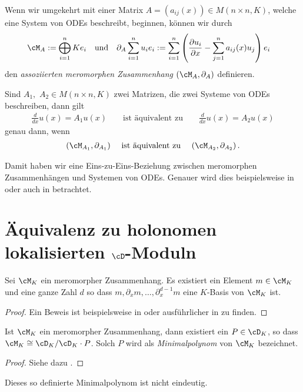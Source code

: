 \begin{defn}
Wenn wir umgekehrt mit einer Matrix $A=(a_{ij}(x))\in M(n\times n,K)$,
welche eine System von ODEs beschreibt, beginnen, können wir durch
\begin{align*}
\cM_A & :=\bigoplus_{i=1}^n Ke_i &&\text{und}
& \partial_A \sum_{i=1}^n u_ie_i &:= \sum_{i=1}^n\left(
\frac{\partial u_i}{\partial x}-\sum_{j=1}^na_{ij}(x)u_j \right)e_i
\end{align*}
den \emph{assoziierten meromorphen Zusammenhang} $(\cM_A,\partial_A)$ definieren.
\end{defn}
\begin{comment}
TODO: zueinander inverse bijektionen?
\end{comment}
\begin{lem}
Sind $A_1,$ $A_2\in M(n\times n,K)$ zwei Matrizen, die zwei Systeme von ODEs
beschreiben, dann gilt
\begin{align*}
\frac{d}{dx}u(x)=A_1u(x) && \text{ ist äquivalent zu }
&& \frac{d}{dx}u(x)=A_2u(x)
\end{align*}
genau dann, wenn
\begin{align*}
(\cM_{A_1},\partial_{A_1}) && \text{ ist äquivalent zu }
&& (\cM_{A_2},\partial_{A_2}) \,.
\end{align*}
\end{lem}
Damit haben wir eine Eins-zu-Eins-Beziehung zwischen meromorphen
Zusammenhängen und Systemen von ODEs.
Genauer wird dies beispielsweise in \cite[Sec 5.1]{hotta2007d} oder
auch in \cite[Sec 3]{sabbah_cimpa90} betrachtet.

\section{Äquivalenz zu holonomen lokalisierten $\cD$-Moduln}
\begin{lem} \label{lem:Zyklischer-Vektor}
Sei $\cM_K$ ein meromorpher Zusammenhang. Es existiert ein Element
$m\in\cM_K$ und eine ganze Zahl $d$ so dass
$m,\partial_xm,\dots,\partial_x^{d-1}m$ eine $K$-Basis von $\cM_K$ ist.
\end{lem}

\begin{proof}
Ein Beweis ist beispielsweise in \cite[Thm 4.3.3]{sabbah_cimpa90} oder
ausführlicher in \cite[Satz 4.8]{ZulaBarbara} zu finden.
\end{proof}
\begin{lemdef}
Ist $\cM_K$ ein meromorpher Zusammenhang, dann existiert ein $P\in\cD_K$, so
dass $\cM_K\cong\cD_K/\cD_K\cdot P$. Solch $P$ wird als \emph{Minimalpolynom}
von $\cM_K$ bezeichnet.
\end{lemdef}
\begin{proof}
Siehe dazu \cite[Satz 4.12]{ZulaBarbara}.
\begin{comment}
\cite[Thm 4.3.2]{sabbah_cimpa90}
\end{comment}
\end{proof}
\begin{bem}
Dieses so definierte Minimalpolynom ist nicht eindeutig.
\end{bem}

